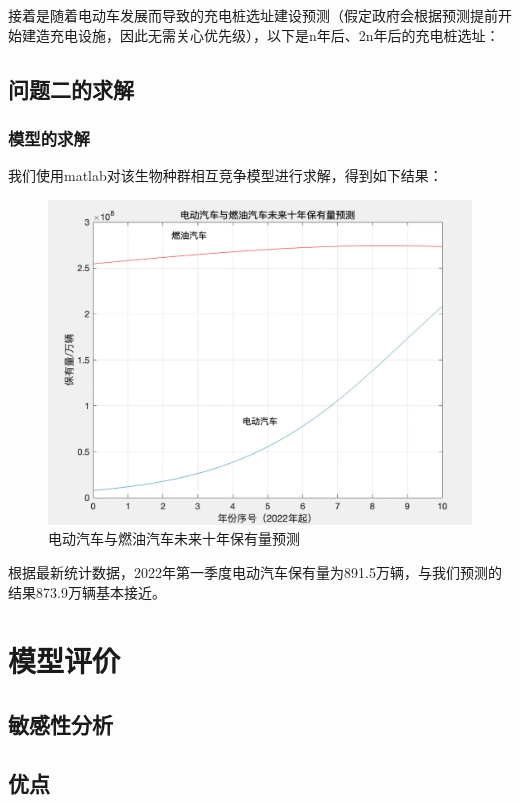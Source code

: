 \documentclass[12pt, a4paper, oneside]{ctexart}
\begin{document}
接着是随着电动车发展而导致的充电桩选址建设预测（假定政府会根据预测提前开始建造充电设施，因此无需关心优先级），以下是n年后、2n年后的充电桩选址：


\subsection{问题二的求解}
\subsubsection{模型的求解}

我们使用matlab对该生物种群相互竞争模型进行求解，得到如下结果：

\begin{figure}[H]
  \centering
  \includegraphics[width=\textwidth]{pic/911652953505_.pic.jpg}
  \caption{电动汽车与燃油汽车未来十年保有量预测}
  \label{fig:电动汽车与燃油汽车未来十年保有量预测}
\end{figure}

根据最新统计数据，2022年第一季度电动汽车保有量为891.5万辆，与我们预测的结果873.9万辆基本接近。




\section{模型评价}
\subsection{敏感性分析}
\subsection{优点}
\end{document}

